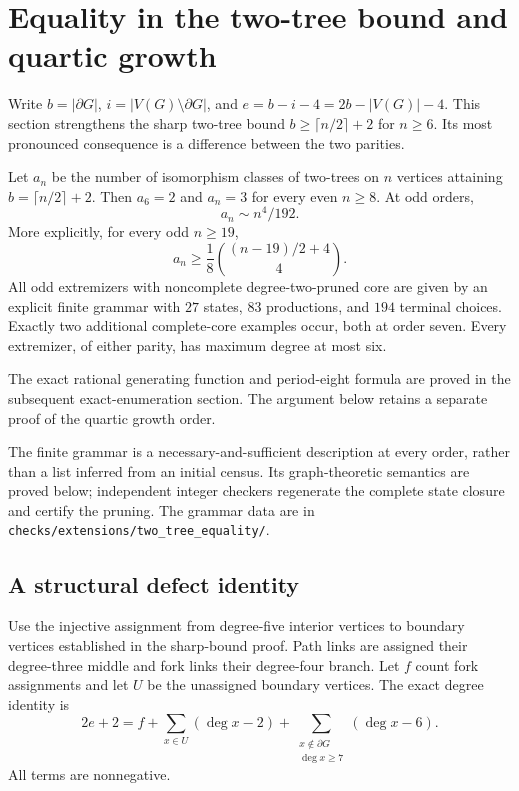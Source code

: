 \section{Equality in the two-tree bound and quartic growth}
\label{sec:two-tree-equality-new}

Write $b=|\partial G|$, $i=|V(G)\setminus\partial G|$, and
$e=b-i-4=2b-|V(G)|-4$.  This section strengthens the sharp two-tree
bound $b\ge\lceil n/2\rceil+2$ for $n\ge6$.  Its most pronounced
consequence is a difference between the two parities.

\begin{theorem}
Let $a_n$ be the number of isomorphism classes of two-trees on $n$ vertices
attaining $b=\lceil n/2\rceil+2$.
Then $a_6=2$ and $a_n=3$ for every even $n\ge8$.  At odd orders,
\[
 a_n\sim n^4/192.
\]
More explicitly, for every odd $n\ge19$,
\[
 a_n\ge \frac18\binom{(n-19)/2+4}{4}.
\]
All odd extremizers with noncomplete degree-two-pruned core are given by
an explicit finite grammar with $27$ states, $83$ productions, and $194$
terminal choices.  Exactly two additional complete-core examples occur,
both at order seven.  Every extremizer, of either parity, has maximum
degree at most six.
\end{theorem}

The exact rational generating function and period-eight formula are
proved in the subsequent exact-enumeration section.  The argument
below retains a separate proof of the quartic growth order.

The finite grammar is a necessary-and-sufficient description at every
order, rather than a list inferred from an initial census.  Its
graph-theoretic semantics are proved below; independent integer
checkers regenerate the complete state closure and certify the
pruning.  The grammar data are in
\texttt{checks/extensions/two\_tree\_equality/}.

\subsection{A structural defect identity}

Use the injective assignment from degree-five interior vertices to
boundary vertices established in the sharp-bound proof.  Path links
are assigned their degree-three middle and fork links their
degree-four branch.  Let $f$ count fork assignments and let $U$ be the
unassigned boundary vertices.  The exact degree identity is
\begin{equation}
 2e+2=f+\sum_{x\in U}(\deg x-2)
       +\sum_{\substack{x\notin\partial G\\\deg x\ge7}}(\deg x-6).
 \label{eq:new-defect}
\end{equation}
All terms are nonnegative.

